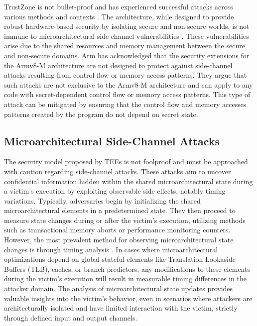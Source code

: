TrustZone is not bullet-proof and has experienced successful attacks across various methods and contexts \cite{DemystifyingAT, surveyonTEE, returntononsecure}. The architecture, while designed to provide robust hardware-based security by isolating secure and non-secure worlds, is not immune to microarchitectural side-channel vulnerabilities \cite{DemystifyingAT, busted, surveyonTEE, truspy, Bypassed}. These vulnerabilities arise due to the shared resources and memory management between the secure and non-secure domains. Arm \cite{armdeveloper} has acknowledged that the security extensions for the Armv8-M architecture are not designed to protect against side-channel attacks resulting from control flow or memory access patterns. They argue that such attacks are not exclusive to the Armv8-M architecture and can apply to any code with secret-dependent control flow or memory access patterns. This type of attack can be mitigated by ensuring that the control flow and memory accesses patterns created by the program do not depend on secret state.

\subsection{Microarchitectural Side-Channel Attacks}

The security model proposed by \acp{TEE} is not foolproof and must be approached with caution regarding side-channel attacks. These attacks aim to uncover confidential information hidden within the shared microarchitectural state during a victim's execution by exploiting observable side effects, notably timing variations. Typically, adversaries begin by initializing the shared microarchitectural elements in a predetermined state. They then proceed to measure state changes during or after the victim's execution, utilizing methods such as transactional memory aborts or performance monitoring counters. However, the most prevalent method for observing microarchitectural state changes is through timing analysis \cite{vanbulckphdthesis}. In cases where microarchitectural optimizations depend on global stateful elements like Translation Lookaside Buffers (TLB), caches, or branch predictors, any modifications to these elements during the victim's execution will result in measurable timing differences in the attacker domain. The analysis of microarchitectural state updates provides valuable insights into the victim's behavior, even in scenarios where attackers are architecturally isolated and have limited interaction with the victim, strictly through defined input and output channels.

